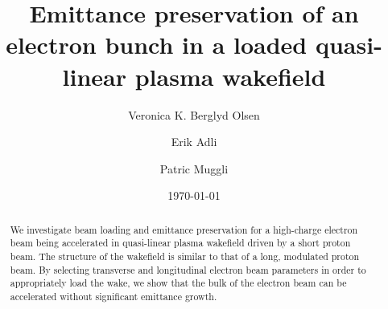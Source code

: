 \documentclass[aps,prstab,reprint,amsmath,amssymb,groupedaddress]{revtex4-1}
\begin{document}


\title{Emittance preservation of an electron bunch in a loaded quasi-linear plasma wakefield}

\author{Veronica K. Berglyd Olsen}

\author{Erik Adli}

\author{Patric Muggli}

\date{\today}

\begin{abstract}
We investigate beam loading and emittance preservation for a high-charge electron beam being accelerated in quasi-linear
plasma wakefield driven by a short proton beam. The structure of the wakefield is similar to that of a long, modulated
proton beam. By selecting transverse and longitudinal electron beam parameters in order to appropriately load the wake,
we show that the bulk of the electron beam can be accelerated without significant emittance growth.
\end{abstract}

\maketitle
\end{document}
